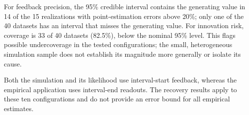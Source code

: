 For feedback precision, the 95\% credible interval contains the generating value in 14 of the 15 realizations with point-estimation errors above 20\%; only one of the 40 datasets has an interval that misses the generating value. For innovation risk, coverage is 33 of 40 datasets (82.5\%), below the nominal 95\% level. This flags possible undercoverage in the tested configurations; the small, heterogeneous simulation sample does not establish its magnitude more generally or isolate its cause.

Both the simulation and its likelihood use interval-start feedback, whereas the empirical application uses interval-end readouts. The recovery results apply to these ten configurations and do not provide an error bound for all empirical estimates.

